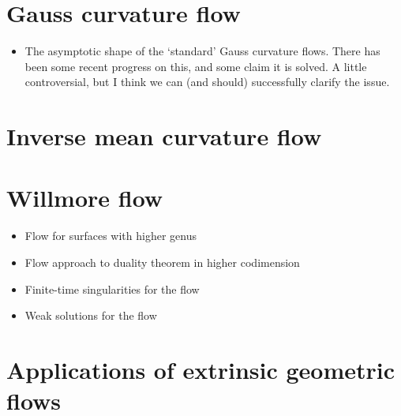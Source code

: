\documentclass{amsart}
\theoremstyle{definition}
\begin{document}
\newpage

\section{Gauss curvature flow}

\begin{refsection}

\begin{itemize}
\item The asymptotic shape of the `standard' Gauss curvature flows. There has been some recent progress on this, and some claim it is solved. A little controversial, but I think we can (and should) successfully clarify the issue.
\end{itemize}

\printbibliography[heading=subbibliography]
\end{refsection}

\section{Inverse mean curvature flow}

\begin{refsection}

\printbibliography[heading=subbibliography]
\end{refsection}

\section{Willmore flow}

\begin{refsection}

\begin{itemize}
\item Flow for surfaces with higher genus
\item Flow approach to duality theorem in higher codimension
\item Finite-time singularities for the flow
\item Weak solutions for the flow
\end{itemize}

\printbibliography[heading=subbibliography]
\end{refsection}

\section{Applications of extrinsic geometric flows}
\end{document}
